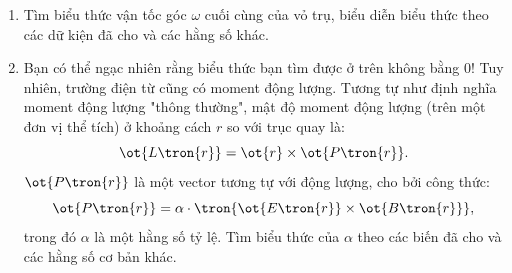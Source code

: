 \begin{vd}
\begin{center}
\begin{tikzpicture}[x=0.75pt,y=0.75pt,yscale=-1,xscale=1]
\end{tikzpicture}

\end{center}
\begin{enumerate} [1)]
    \item Tìm biểu thức vận tốc góc $\omega$ cuối cùng của vỏ trụ, biểu diễn biểu thức theo các dữ kiện đã cho và các hằng số khác.
    \item Bạn có thể ngạc nhiên rằng biểu thức bạn tìm được ở trên không bằng $0$! Tuy nhiên, trường điện từ cũng có moment động lượng. Tương tự như định nghĩa moment động lượng "thông thường", mật độ moment động lượng (trên một đơn vị thể tích) ở khoảng cách $r$ so với trục quay là:
    $$\ot{L\tron{r}}=\ot{r}\times \ot{P\tron{r}}.$$
    $\ot{P\tron{r}}$ là một vector tương tự với động lượng, cho bởi công thức:
    $$\ot{P\tron{r}}=\alpha\cdot\tron{\ot{E\tron{r}}\times \ot{B\tron{r}}},$$
    trong đó $\alpha$ là một hằng số tỷ lệ. Tìm biểu thức của $\alpha$ theo các biến đã cho và các hằng số cơ bản khác.
\end{enumerate}
\end{vd}


